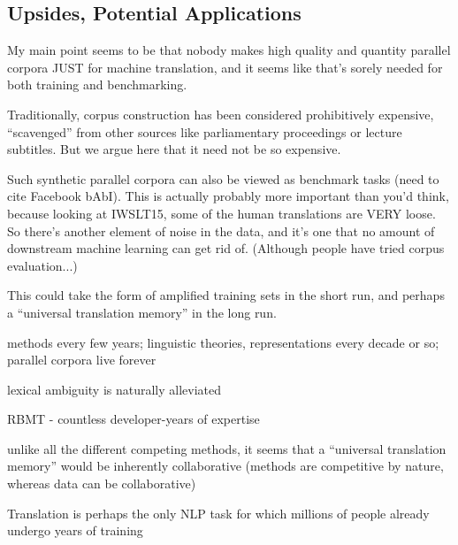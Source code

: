 \subsection{Upsides, Potential Applications}


My main point seems to be that nobody makes high quality and quantity parallel corpora JUST for machine translation, and it seems like that's sorely needed for both training and benchmarking.

Traditionally, corpus construction has been considered prohibitively expensive, ``scavenged'' from other sources like parliamentary proceedings or lecture subtitles.
But we argue here that it need not be so expensive.

Such synthetic parallel corpora can also be viewed as benchmark tasks (need to cite Facebook bAbI).
This is actually probably more important than you'd think, because looking at IWSLT15, some of the human translations are VERY loose.
So there's another element of noise in the data, and it's one that no amount of downstream machine learning can get rid of.
(Although people have tried corpus evaluation...)





This could take the form of amplified training sets in the short run, and perhaps a ``universal translation memory'' in the long run.

methods every few years; linguistic theories, representations every decade or so; parallel corpora live forever

lexical ambiguity is naturally alleviated

RBMT - countless developer-years of expertise

unlike all the different competing methods, it seems that a ``universal translation memory'' would be inherently collaborative (methods are competitive by nature, whereas data can be collaborative)





Translation is perhaps the only NLP task for which millions of people already undergo years of training


